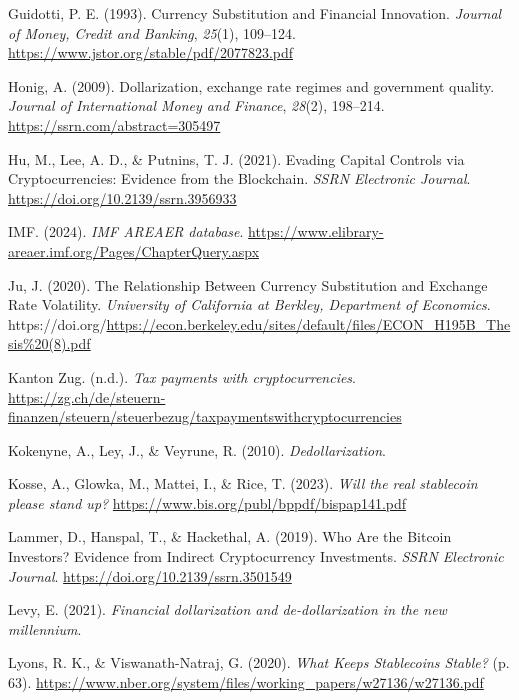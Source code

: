 \documentclass[
]{article}
\newlength{\cslhangindent}
\newenvironment{CSLReferences}[2] %
 {\begin{list}{}{%
  \setlength{\itemindent}{0pt}
  \setlength{\leftmargin}{0pt}
  \setlength{\parsep}{0pt}
  \ifodd #1
   \setlength{\leftmargin}{\cslhangindent}
   \setlength{\itemindent}{-1\cslhangindent}
  \fi
  \setlength{\itemsep}{#2\baselineskip}}}
 {\end{list}}
\begin{document}
\begin{CSLReferences}{1}{0}
Guidotti, P. E. (1993). Currency Substitution and Financial Innovation. \emph{Journal of Money, Credit and Banking}, \emph{25}(1), 109--124. \url{https://www.jstor.org/stable/pdf/2077823.pdf}

Honig, A. (2009). Dollarization, exchange rate regimes and government quality. \emph{Journal of International Money and Finance}, \emph{28}(2), 198--214. \url{https://ssrn.com/abstract=305497}

Hu, M., Lee, A. D., \& Putnins, T. J. (2021). Evading Capital Controls via Cryptocurrencies: Evidence from the Blockchain. \emph{SSRN Electronic Journal}. \url{https://doi.org/10.2139/ssrn.3956933}

IMF. (2024). \emph{IMF AREAER database}. \url{https://www.elibrary-areaer.imf.org/Pages/ChapterQuery.aspx}

Ju, J. (2020). The Relationship Between Currency Substitution and Exchange Rate Volatility. \emph{University of California at Berkley, Department of Economics}. https://doi.org/\url{https://econ.berkeley.edu/sites/default/files/ECON_H195B_Thesis\%20(8).pdf}

Kanton Zug. (n.d.). \emph{Tax payments with cryptocurrencies}. \url{https://zg.ch/de/steuern-finanzen/steuern/steuerbezug/taxpaymentswithcryptocurrencies}

Kokenyne, A., Ley, J., \& Veyrune, R. (2010). \emph{Dedollarization}.

Kosse, A., Glowka, M., Mattei, I., \& Rice, T. (2023). \emph{Will the real stablecoin please stand up?} \url{https://www.bis.org/publ/bppdf/bispap141.pdf}

Lammer, D., Hanspal, T., \& Hackethal, A. (2019). Who Are the Bitcoin Investors? Evidence from Indirect Cryptocurrency Investments. \emph{SSRN Electronic Journal}. \url{https://doi.org/10.2139/ssrn.3501549}

Levy, E. (2021). \emph{Financial dollarization and de-dollarization in the new millennium}.

Lyons, R. K., \& Viswanath-Natraj, G. (2020). \emph{What Keeps Stablecoins Stable?} (p. 63). \url{https://www.nber.org/system/files/working_papers/w27136/w27136.pdf}


\end{CSLReferences}
\end{document}
